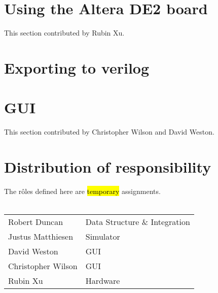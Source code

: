 \documentclass[12pt, a4paper, oneside,titlepage]{article}
\begin{document}
\section{Using the Altera DE2 board}
This section contributed by Rubin Xu.



\section{Exporting to verilog}

\section{GUI}
This section contributed by Christopher Wilson and David Weston.

\section{Distribution of responsibility}
The r\^oles defined here are \hl{temporary} assignments. \\ \\ 
\begin{tabular}{l l}
Robert Duncan & Data Structure \& Integration\\ 
Justus Matthiesen & Simulator \\
David Weston & GUI \\
Christopher Wilson & GUI \\
Rubin Xu & Hardware \\
\end{tabular}
\end{document}
